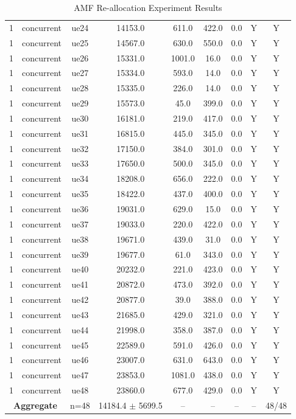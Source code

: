 \begin{table}[ht]
\begin{tabular}{|c|c|c|c|c|c|c|c|c|}
1 & concurrent & ue24 & 14153.0 & 611.0 & 422.0 & 0.0 & Y & Y \\
1 & concurrent & ue25 & 14567.0 & 630.0 & 550.0 & 0.0 & Y & Y \\
1 & concurrent & ue26 & 15331.0 & 1001.0 & 16.0 & 0.0 & Y & Y \\
1 & concurrent & ue27 & 15334.0 & 593.0 & 14.0 & 0.0 & Y & Y \\
1 & concurrent & ue28 & 15335.0 & 226.0 & 14.0 & 0.0 & Y & Y \\
1 & concurrent & ue29 & 15573.0 & 45.0 & 399.0 & 0.0 & Y & Y \\
1 & concurrent & ue30 & 16181.0 & 219.0 & 417.0 & 0.0 & Y & Y \\
1 & concurrent & ue31 & 16815.0 & 445.0 & 345.0 & 0.0 & Y & Y \\
1 & concurrent & ue32 & 17150.0 & 384.0 & 301.0 & 0.0 & Y & Y \\
1 & concurrent & ue33 & 17650.0 & 500.0 & 345.0 & 0.0 & Y & Y \\
1 & concurrent & ue34 & 18208.0 & 656.0 & 222.0 & 0.0 & Y & Y \\
1 & concurrent & ue35 & 18422.0 & 437.0 & 400.0 & 0.0 & Y & Y \\
1 & concurrent & ue36 & 19031.0 & 629.0 & 15.0 & 0.0 & Y & Y \\
1 & concurrent & ue37 & 19033.0 & 220.0 & 422.0 & 0.0 & Y & Y \\
1 & concurrent & ue38 & 19671.0 & 439.0 & 31.0 & 0.0 & Y & Y \\
1 & concurrent & ue39 & 19677.0 & 61.0 & 343.0 & 0.0 & Y & Y \\
1 & concurrent & ue40 & 20232.0 & 221.0 & 423.0 & 0.0 & Y & Y \\
1 & concurrent & ue41 & 20872.0 & 473.0 & 392.0 & 0.0 & Y & Y \\
1 & concurrent & ue42 & 20877.0 & 39.0 & 388.0 & 0.0 & Y & Y \\
1 & concurrent & ue43 & 21685.0 & 429.0 & 321.0 & 0.0 & Y & Y \\
1 & concurrent & ue44 & 21998.0 & 358.0 & 387.0 & 0.0 & Y & Y \\
1 & concurrent & ue45 & 22589.0 & 591.0 & 426.0 & 0.0 & Y & Y \\
1 & concurrent & ue46 & 23007.0 & 631.0 & 643.0 & 0.0 & Y & Y \\
1 & concurrent & ue47 & 23853.0 & 1081.0 & 438.0 & 0.0 & Y & Y \\
1 & concurrent & ue48 & 23860.0 & 677.0 & 429.0 & 0.0 & Y & Y \\
\multicolumn{2}{|c|}{\textbf{Aggregate}} & n=48 & 14184.4 $\pm$ 5699.5 & -- & -- & -- & -- & 48/48 \\
\hline
\end{tabular}
\caption{AMF Re-allocation Experiment Results}
\label{tab:amf_realloc}
\end{table}
